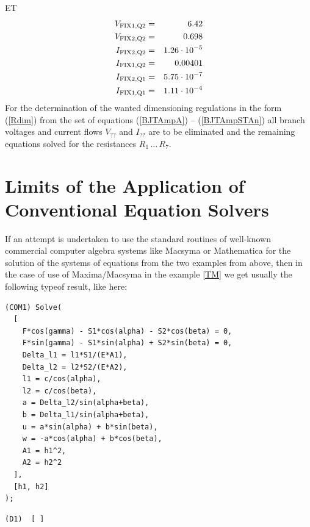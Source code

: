\begin{example}{ET}
\begin{eqnarray}
V_{\rm FIX1,Q2} & = & 6.42 \\
V_{\rm FIX2,Q2} & = & 0.698 \\
I_{\rm FIX2,Q2} & = & 1.26 \cdot 10^{-5} \\
I_{\rm FIX1,Q2} & = & 0.00401 \\
I_{\rm FIX2,Q1} & = & 5.75 \cdot 10^{-7} \\
I_{\rm FIX1,Q1} & = & 1.11 \cdot 10^{-4} \label{BJTAmpSTAn}
\end{eqnarray}
For the determination of the wanted dimensioning regulations in the form (\ref{Rdim}) from the set of equations (\ref{BJTAmpA}) -- (\ref{BJTAmpSTAn})  all branch voltages and current flows $V_{??}$ and $I_{??}$ are to be eliminated
 and the remaining equations solved for the resistances $R_1 \, \ldots \, R_7$.
\end{example}

\section[ Conventional Equation Solver]{Limits of the Application of Conventional Equation Solvers}

If an attempt is undertaken to use the standard routines of well-known commercial computer algebra systems like Macsyma \cite{Macsyma}  or Mathematica \cite{Wolfram} for the solution of the systems of equations from the two examples from above, then in the case of use of  Maxima/Macsyma in the example  \ref{TM} we get usually the following typeof  result, like here:

\begin{eiginput}\item
\begin{verbatim}
(COM1) Solve(
  [
    F*cos(gamma) - S1*cos(alpha) - S2*cos(beta) = 0,
    F*sin(gamma) - S1*sin(alpha) + S2*sin(beta) = 0,
    Delta_l1 = l1*S1/(E*A1),
    Delta_l2 = l2*S2/(E*A2),
    l1 = c/cos(alpha),
    l2 = c/cos(beta),
    a = Delta_l2/sin(alpha+beta),
    b = Delta_l1/sin(alpha+beta),
    u = a*sin(alpha) + b*sin(beta),
    w = -a*cos(alpha) + b*cos(beta),
    A1 = h1^2,
    A2 = h2^2
  ],
  [h1, h2]
);
\end{verbatim}%
\end{eiginput}
\begin{eigoutput}\item
\begin{verbatim}
(D1)  [ ]
\end{verbatim}%
\end{eigoutput}


